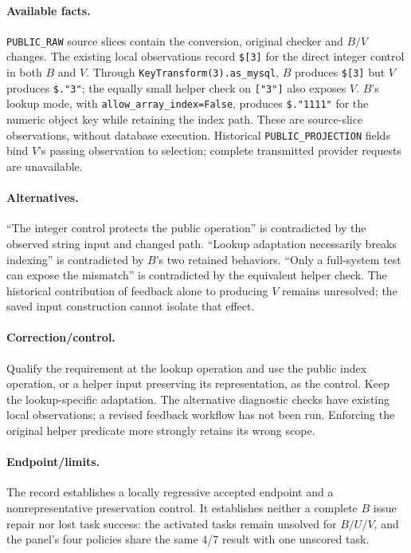 \paragraph{Available facts.}
\texttt{PUBLIC\_RAW} source slices contain the conversion, original checker
and $B/V$ changes. The existing local observations record \texttt{\$[3]} for
the direct integer control in both $B$ and $V$. Through
\texttt{KeyTransform(3).as\_mysql}, $B$ produces \texttt{\$[3]} but $V$
produces \texttt{\$."3"}; the equally small helper check on \texttt{["3"]}
also exposes $V$. $B$'s lookup mode, with
\texttt{allow\_array\_index=False}, produces \texttt{\$."1111"} for the
numeric object key while retaining the index path. These are source-slice
observations, without database execution. Historical
\texttt{PUBLIC\_PROJECTION} fields bind $V$'s passing observation to selection;
complete transmitted provider requests are unavailable.

\paragraph{Alternatives.}
``The integer control protects the public operation'' is contradicted by
the observed string input and changed path. ``Lookup adaptation necessarily
breaks indexing'' is contradicted by $B$'s two retained behaviors. ``Only a
full-system test can expose the mismatch'' is contradicted by the equivalent
helper check. The historical contribution of feedback alone to producing $V$
remains unresolved; the saved input construction cannot isolate that effect.

\paragraph{Correction/control.}
Qualify the requirement at the lookup operation and use the public index
operation, or a helper input preserving its representation, as the control.
Keep the lookup-specific adaptation. The alternative diagnostic checks have
existing local observations; a revised feedback workflow has not been run.
Enforcing the original helper predicate more strongly retains its wrong scope.

\paragraph{Endpoint/limits.}
The record establishes a locally regressive accepted endpoint and a
nonrepresentative preservation control. It establishes neither a complete
$B$ issue repair nor lost task success: the activated tasks remain unsolved
for $B/U/V$, and the panel's four policies share the same 4/7 result with one
unscored task.


